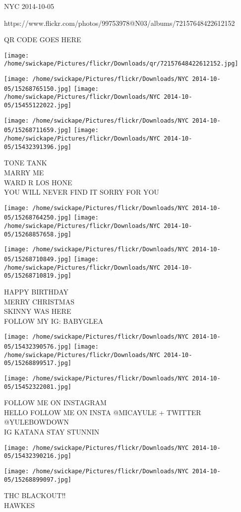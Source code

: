 \documentclass[10pt,letterpaper]{article}
\begin{document}
NYC 2014-10-05

https://www.flickr.com/photos/99753978@N03/albums/72157648422612152

QR CODE GOES HERE

\texttt{[image: /home/swickape/Pictures/flickr/Downloads/qr/72157648422612152.jpg]}
\pagebreak

\texttt{[image: /home/swickape/Pictures/flickr/Downloads/NYC 2014-10-05/15268765150.jpg]}
\texttt{[image: /home/swickape/Pictures/flickr/Downloads/NYC 2014-10-05/15455122022.jpg]}

\texttt{[image: /home/swickape/Pictures/flickr/Downloads/NYC 2014-10-05/15268711659.jpg]}
\texttt{[image: /home/swickape/Pictures/flickr/Downloads/NYC 2014-10-05/15432391396.jpg]}

TONE TANK\\
MARRY ME\\
WARD R LOS HONE\\
YOU WILL NEVER FIND IT SORRY FOR YOU\\
\pagebreak

\texttt{[image: /home/swickape/Pictures/flickr/Downloads/NYC 2014-10-05/15268764250.jpg]}
\texttt{[image: /home/swickape/Pictures/flickr/Downloads/NYC 2014-10-05/15268857658.jpg]}

\texttt{[image: /home/swickape/Pictures/flickr/Downloads/NYC 2014-10-05/15268710849.jpg]}
\texttt{[image: /home/swickape/Pictures/flickr/Downloads/NYC 2014-10-05/15268710819.jpg]}

HAPPY BIRTHDAY\\
MERRY CHRISTMAS\\
SKINNY WAS HERE\\
FOLLOW MY IG: BABYGLEA\\
\pagebreak

\texttt{[image: /home/swickape/Pictures/flickr/Downloads/NYC 2014-10-05/15432390576.jpg]}
\texttt{[image: /home/swickape/Pictures/flickr/Downloads/NYC 2014-10-05/15268899517.jpg]}

\vspace{0.25in}
\texttt{[image: /home/swickape/Pictures/flickr/Downloads/NYC 2014-10-05/15452322081.jpg]}

FOLLOW ME ON INSTAGRAM\\
HELLO FOLLOW ME ON INSTA @MICAYULE + TWITTER @YULEBOWDOWN\\
IG KATANA STAY STUNNIN\\
\pagebreak

\texttt{[image: /home/swickape/Pictures/flickr/Downloads/NYC 2014-10-05/15432390216.jpg]}

\vspace{0.25in}
\texttt{[image: /home/swickape/Pictures/flickr/Downloads/NYC 2014-10-05/15268899097.jpg]}

THC BLACKOUT!!\\
HAWKES\\
\pagebreak
\end{document}
